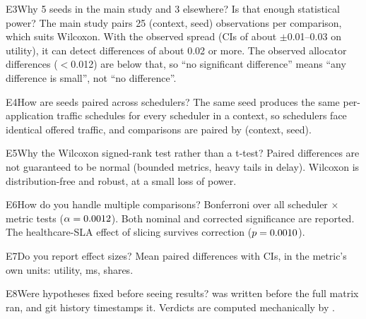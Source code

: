 \begin{qa}{E3}{Why 5 seeds in the main study and 3 elsewhere? Is that enough statistical power?}
The main study pairs 25 (context, seed) observations per comparison, which suits Wilcoxon. With the observed spread
(CIs of about $\pm$0.01--0.03 on utility), it can detect differences of about 0.02 or more. The observed allocator
differences ($<$0.012) are below that, so ``no significant difference'' means ``any difference is small'', not ``no
difference''.
\end{qa}

\begin{qa}{E4}{How are seeds paired across schedulers?}
The same seed produces the same per-application traffic schedules for every scheduler in a context, so schedulers face
identical offered traffic, and comparisons are paired by (context, seed).
\end{qa}

\begin{qa}{E5}{Why the Wilcoxon signed-rank test rather than a t-test?}
Paired differences are not guaranteed to be normal (bounded metrics, heavy tails in delay). Wilcoxon is distribution-free
and robust, at a small loss of power.
\end{qa}

\begin{qa}{E6}{How do you handle multiple comparisons?}
Bonferroni over all scheduler $\times$ metric tests ($\alpha=0.0012$). Both nominal and corrected significance are
reported. The healthcare-SLA effect of slicing survives correction ($p=0.0010$).
\end{qa}

\begin{qa}{E7}{Do you report effect sizes?}
Mean paired differences with CIs, in the metric's own units: utility, ms, shares.
\end{qa}

\begin{qa}{E8}{Were hypotheses fixed before seeing results?}
 was written before the full matrix ran, and git history timestamps it. Verdicts are
computed mechanically by .
\end{qa}

